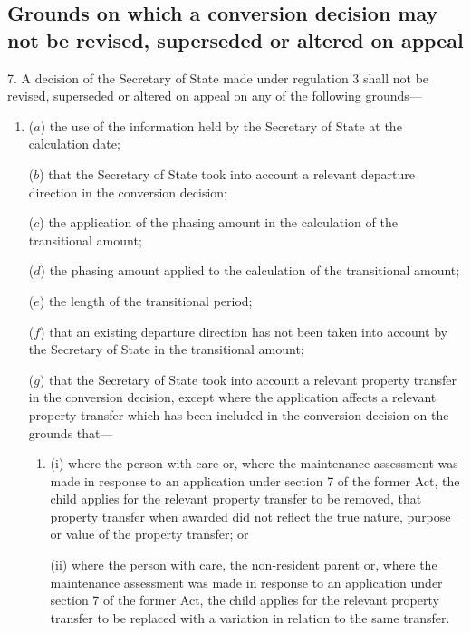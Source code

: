 \documentclass[12pt,a4paper]{article}
\begin{document}
\subsection[7. Grounds on which a conversion decision may not be revised, superseded or altered on appeal]{Grounds on which a conversion decision may not be revised, superseded or altered on appeal}

7.  A decision of the Secretary of State made under regulation 3 shall not be revised, superseded or altered on appeal on any of the following grounds—
\begin{enumerate}\item[]
($a$) the use of the information held by the Secretary of State at the calculation date;

($b$) that the Secretary of State took into account a relevant departure direction in the conversion decision;

($c$) the application of the phasing amount in the calculation of the transitional amount;

($d$) the phasing amount applied to the calculation of the transitional amount;

($e$) the length of the transitional period;

($f$) that an existing departure direction has not been taken into account by the Secretary of State in the transitional amount;

($g$) that the Secretary of State took into account a relevant property transfer in the conversion decision, except where the application affects a relevant property transfer which has been included in the conversion decision on the grounds that—
\begin{enumerate}\item[]
(i) where the person with care or, where the maintenance assessment was made in response to an application under section 7 of the former Act, the child applies for the relevant property transfer to be removed, that property transfer when awarded did not reflect the true nature, purpose or value of the property transfer; or

(ii) where the person with care, the non-resident parent or, where the maintenance assessment was made in response to an application under section 7 of the former Act, the child applies for the relevant property transfer to be replaced with a variation in relation to the same transfer.
\end{enumerate}
\end{enumerate}
\end{document}
